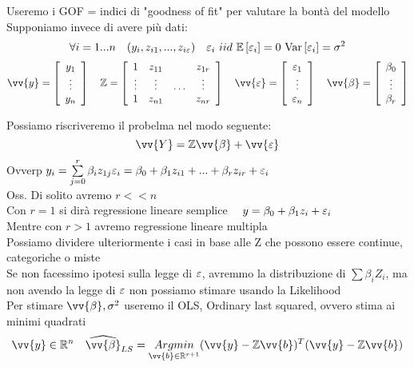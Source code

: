 Useremo i GOF = indici di "goodness of fit" per valutare la bontà del modello \\

Supponiamo invece di avere più dati:
\[
\forall i = 1...n \ \ \ (y_i,z_{i1},...,z_{i\eps}) \ \ \ \eps_i \ iid \ \E{\eps_i}=0 \ \var{\eps_i}=\sigma^2
\]
\[
\vv{y}=\OO\begin{array}{c}
     y_1  \\
     \vdots \\
     y_n
\end{array}\CC \ \ \ 
\ZZ=\OO\begin{array}{ccc c}
     1 & z_{11} &  & z_{1r}  \\
     \vdots & \vdots & \hdots & \vdots\\
     1 & z_{n1} &  & z_{nr}
\end{array}\CC \ \ \
\vv{\eps}=\OO\begin{array}{c}
     \eps_1  \\
     \vdots \\
     \eps_n
\end{array}\CC \ \ \ 
\vv{\beta}=\OO\begin{array}{c}
     \beta_0  \\
     \vdots \\
     \beta_r
\end{array}\CC
\]

Possiamo riscriveremo il probelma nel modo seguente:
\[
\vv{Y}= \ZZ \vv{\beta} + \vv{\eps}
\]
Ovverp $y_i=\sum\limits_{j=0}^{r}\beta_iz_{1j} \varepsilon_i = \beta_0 + \beta_1z_{i1}+ ... + \beta_rz_{ir} +\varepsilon_i$\\
Oss. Di solito avremo $r<<n$\\

Con $r=1$ si dirà regressione lineare semplice \ \ $y=\beta_0 +\beta_1z_i + \varepsilon_i$\\
Mentre con $r>1$ avremo regressione lineare multipla\\
Possiamo dividere ulteriormente i casi in base alle Z che possono essere continue, categoriche o miste\\

Se non facessimo ipotesi sulla legge di $\varepsilon$, avremmo la distribuzione di $\sum \beta_iZ_i$, ma non avendo la legge di $\varepsilon$ non possiamo stimare usando la Likelihood\\
Per stimare $\vv{\beta}, \sigma^2$ useremo il OLS, Ordinary last squared, ovvero stima ai minimi quadrati
\[
\vv{y}\in \R^n \ \ \ \hat{\vv{\beta}}_{LS} = \underset{\vv{b}\in\R^{r+1}}{Argmin} (\vv{y}-\ZZ\vv{b})^T(\vv{y}-\ZZ\vv{b})
\]

